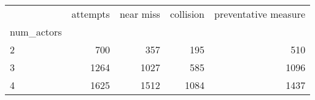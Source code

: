 \begin{tabular}{lrrrr}
\toprule
{} &  attempts &  near miss &  collision &  preventative measure \\
num\_actors &           &            &            &                       \\
\midrule
2          &       700 &        357 &        195 &                   510 \\
3          &      1264 &       1027 &        585 &                  1096 \\
4          &      1625 &       1512 &       1084 &                  1437 \\
\bottomrule
\end{tabular}

